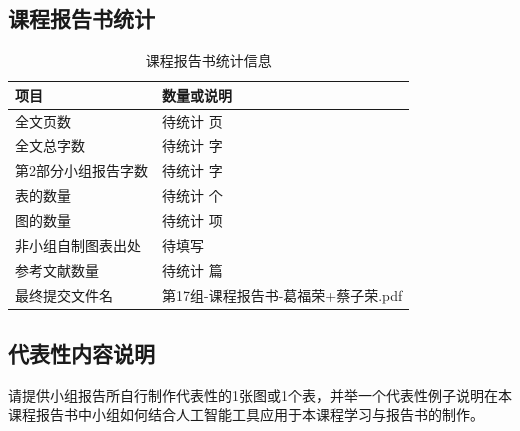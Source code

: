 \documentclass[UTF8,zihao=-4]{ctexart}
\begin{document}
\subsection*{课程报告书统计}

\begin{table}[H]
    \centering
    \caption{课程报告书统计信息}
    \begin{tabular}{ll}
        \toprule
        项目 & 数量或说明 \\
        \midrule
        全文页数 & 待统计 页 \\
        全文总字数 & 待统计 字 \\
        第2部分小组报告字数 & 待统计 字 \\
        表的数量 & 待统计 个 \\
        图的数量 & 待统计 项 \\
        非小组自制图表出处 & 待填写 \\
        参考文献数量 & 待统计 篇 \\
        最终提交文件名 & 第17组-课程报告书-葛福荣+蔡子荣.pdf \\
        \bottomrule
    \end{tabular}
\end{table}

\subsection*{代表性内容说明}

请提供小组报告所自行制作代表性的1张图或1个表，并举一个代表性例子说明在本课程报告书中小组如何结合人工智能工具应用于本课程学习与报告书的制作。
\end{document}
